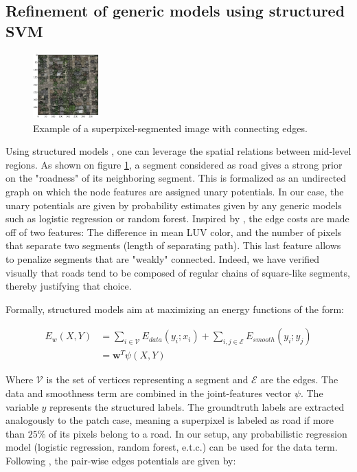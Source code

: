 \documentclass[10pt,conference,compsocconf]{IEEEtran}
\begin{document}
\subsection{Refinement of generic models using structured SVM}
\begin{figure}[htb]
\centering
\includegraphics[width=0.23\textwidth]{ex_graph.png}
\caption{\label{fig:graph}
Example of a superpixel-segmented image with connecting edges.}
\end{figure}
   Using structured models \cite{tsochantaridis05}, one can leverage the spatial
   relations between mid-level regions. As shown on figure \ref{fig:graph}, a
   segment considered as road gives a strong prior on the "roadness" of its
   neighboring segment. This is formalized as an undirected graph on which the
   node features are assigned unary potentials. In our case, the unary
   potentials are given by probability estimates given by any generic models such as logistic regression or random forest.
Inspired by \cite{fulkerson09}, the edge costs are made off of two features: The difference in mean LUV color, and the number of pixels that separate two segments (length of separating path). This last feature allows to penalize segments that are "weakly" connected. Indeed, we have verified visually that roads tend to be composed of regular chains of square-like segments, thereby justifying that choice.

Formally, structured models aim at maximizing an energy functions of the form:

 \begin{equation}
 \begin{split}
E_w(X,Y) &= \sum_{i \in \mathcal{V}} E_{data}(y_i;x_i) + \sum_{i,j \in \mathcal{E}} E_{smooth}(y_i;y_j) \\
 &= \mathbf{w}^T \psi(X,Y)
 \end{split}
 \end{equation}

Where \(\mathcal{V}\) is the set of vertices representing a segment and \(\mathcal{E}\) are the edges. The data and smoothness term are combined in the joint-features vector \(\psi\). The variable \(y\) represents the structured labels. The groundtruth labels are extracted analogously to the patch case, meaning a superpixel is labeled as road if more than $25\%$ of its pixels belong to a road. In our setup, any probabilistic regression model (logistic regression, random forest, e.t.c.) can be used for the data term. Following \cite{fulkerson09}, the pair-wise edges potentials are given by:
\end{document}
